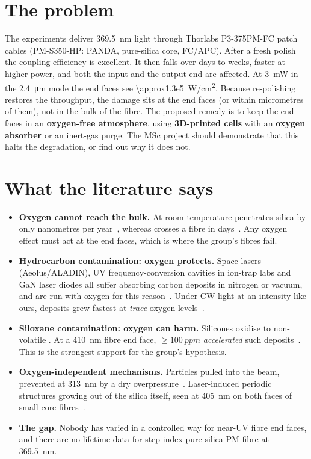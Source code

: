 \section*{The problem}
The \Ybion{} experiments deliver \SI{369.5}{nm} light through Thorlabs P3-375PM-FC patch cables
(PM-S350-HP: PANDA, pure-silica core, FC/APC). After a fresh polish the coupling efficiency is
excellent. It then falls over days to weeks, faster at higher power, and both the input and the output end
are affected. At \SI{3}{mW} in the \SI{2.4}{\micro m} mode the end faces see
\SI{\approx1.3e5}{W/cm^2}. Because re-polishing restores the throughput, the damage sits at the end faces
(or within micrometres of them), not in the bulk of the fibre. The proposed remedy is to keep the end
faces in an \textbf{oxygen-free atmosphere}, using \textbf{3D-printed cells} with an \textbf{oxygen
absorber} or an inert-gas purge. The MSc project should demonstrate that this halts the degradation, or
find out why it does not.

\section*{What the literature says}
\begin{itemize}
  \item \textbf{Oxygen cannot reach the bulk.} At room temperature \Oxy{} penetrates silica by only nanometres
        per year~\cite{Kajihara2010}, whereas \Htwo{} crosses a fibre in days~\cite{Lemaire1991}. Any oxygen
        effect must act at the end faces, which is where the group's fibres fail.
  \item \textbf{Hydrocarbon contamination: oxygen protects.} Space lasers (Aeolus/ALADIN), UV
        frequency-conversion cavities in ion-trap labs and GaN laser diodes all suffer absorbing carbon
        deposits in nitrogen or vacuum, and are run with oxygen for this
        reason~\cite{Hippler2016,Mondin2017,Hannig2018,Schoedl2005}. Under CW light at an intensity like
        ours, deposits grew fastest at \emph{trace} oxygen levels~\cite{Parthasarathy2024}.
  \item \textbf{Siloxane contamination: oxygen can harm.} Silicones oxidise to non-volatile .
        At a \SI{410}{nm} fibre end face, \Oxy{} $\geq\SI{100}{ppm}$ \emph{accelerated} such
        deposits~\cite{Fujifilmpatent2006}. This is the strongest support for the group's hypothesis.
  \item \textbf{Oxygen-independent mechanisms.} Particles pulled into the beam, prevented at \SI{313}{nm}
        by a dry \Ntwo{} overpressure~\cite{Marciniak2017}. Laser-induced periodic structures growing out
        of the silica itself, seen at \SI{405}{nm} on both faces of small-core fibres~\cite{Gonschior2013JNCS}.
  \item \textbf{The gap.} Nobody has varied \Oxy{} in a controlled way for near-UV fibre end faces, and there
        are no lifetime data for step-index pure-silica PM fibre at \SI{369.5}{nm}.
\end{itemize}

